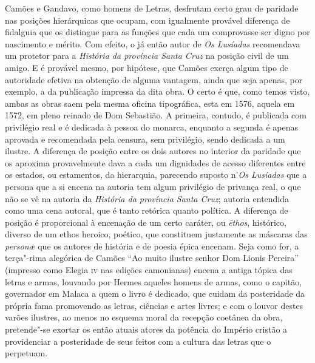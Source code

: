 Camões e Gandavo, como homens de Letras, desfrutam certo grau de
paridade nas posições hierárquicas que ocupam, com igualmente provável
diferença de fidalguia que os distingue para as funções que cada um
comprovasse ser digno por nascimento e mérito. Com efeito, o já então
autor de \textit{Os Lusíadas} recomendava um protetor para a \textit{História da
província Santa Cruz} na posição civil de um amigo. E é provável mesmo,
por hipótese, que Camões exerça algum tipo de autoridade efetiva na
obtenção de alguma vantagem, ainda que seja apenas, por exemplo, a da
publicação impressa da dita obra. O certo é que, como temos visto,
ambas as obras saem pela mesma oficina tipográfica, esta em 1576,
aquela em 1572, em pleno reinado de Dom Sebastião. A primeira, contudo,
é publicada com privilégio real e é dedicada à pessoa do monarca,
enquanto a segunda é apenas aprovada e recomendada pela censura, sem
privilégio, sendo dedicada a um ilustre. A diferença de posição entre
os dois autores no interior da paridade que os aproxima provavelmente
dava a cada um dignidades de acesso diferentes entre os estados, ou
estamentos, da hierarquia, parecendo suposto n'\textit{Os Lusíadas} 
que a persona que a si encena na autoria tem algum privilégio
de privança real, o que não se vê na autoria da \textit{História da província
Santa Cruz}; autoria entendida como uma cena autoral, que é tanto
retórica quanto política. A diferença de posição é proporcional à
encenação de um certo caráter, ou \textit{\=ethos}, histórico, diverso de um 
ethos heroico, poético, que constituem justamente as máscaras das
\textit{person\ae} que os autores de história e de poesia épica encenam. Seja
como for, a terça"-rima alegórica de Camões ``Ao muito
ilustre senhor Dom Lionis Pereira'' (impresso como Elegia
\textsc{iv} nas edições camonianas) encena a antiga tópica das letras e armas,
louvando por Hermes aqueles homens de armas, como o capitão, governador
em Malaca a quem o livro é dedicado, que cuidam da posteridade da
própria fama promovendo as letras, ciências e artes livres; e com o
louvor destes varões ilustres, ao menos no esquema moral da recepção
coetânea da obra, pretende"-se exortar os então atuais atores da
potência do Império cristão a providenciar a posteridade de seus feitos
com a cultura das letras que o perpetuam.

